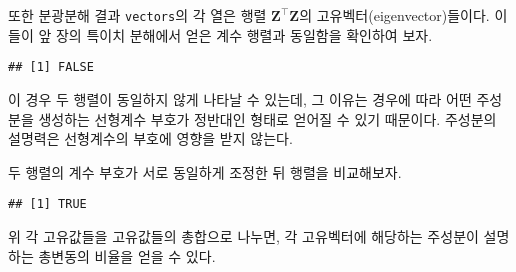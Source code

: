 \documentclass[]{book}
\newenvironment{Shaded}{\begin{snugshade}}{\end{snugshade}}
\newcommand{\DecValTok}[1]{\textcolor[rgb]{0.00,0.00,0.81}{#1}}
\newcommand{\KeywordTok}[1]{\textcolor[rgb]{0.13,0.29,0.53}{\textbf{#1}}}
\newcommand{\NormalTok}[1]{#1}
\newcommand{\OperatorTok}[1]{\textcolor[rgb]{0.81,0.36,0.00}{\textbf{#1}}}
\newcommand{\StringTok}[1]{\textcolor[rgb]{0.31,0.60,0.02}{#1}}
\begin{document}
또한 분광분해 결과 \texttt{vectors}의 각 열은 행렬 \(\mathbf{Z}^\top \mathbf{Z}\)의 고유벡터(eigenvector)들이다. 이들이 앞 장의 특이치 분해에서 얻은 계수 행렬과 동일함을 확인하여 보자.

\begin{Shaded}
\end{Shaded}

\begin{verbatim}
## [1] FALSE
\end{verbatim}

이 경우 두 행렬이 동일하지 않게 나타날 수 있는데, 그 이유는 경우에 따라 어떤 주성분을 생성하는 선형계수 부호가 정반대인 형태로 얻어질 수 있기 때문이다. 주성분의 설명력은 선형계수의 부호에 영향을 받지 않는다.

두 행렬의 계수 부호가 서로 동일하게 조정한 뒤 행렬을 비교해보자.

\begin{Shaded}
\end{Shaded}

\begin{verbatim}
## [1] TRUE
\end{verbatim}

위 각 고유값들을 고유값들의 총합으로 나누면, 각 고유벡터에 해당하는 주성분이 설명하는 총변동의 비율을 얻을 수 있다.

\begin{Shaded}
\end{Shaded}
\end{document}
